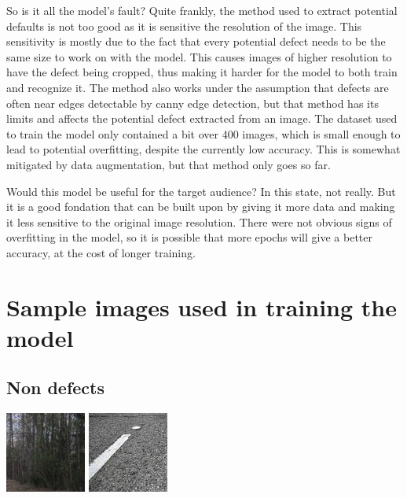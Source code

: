 \documentclass[12pt, letterpaper, twoside]{article}
\begin{document}
So is it all the model's fault? 
Quite frankly, the method used to extract potential defaults is not too good as it is sensitive the resolution of the image.
This sensitivity is mostly due to the fact that every potential defect needs to be the same size to work on with the model.
This causes images of higher resolution to have the defect being cropped, thus making it harder for the model to both train and recognize it.
The method also works under the assumption that defects are often near edges detectable by canny edge detection, 
but that method has its limits and affects the potential defect extracted from an image.
The dataset used to train the model only contained a bit over 400 images, 
which is small enough to lead to potential overfitting, despite the currently low accuracy.
This is somewhat mitigated by data augmentation, but that method only goes so far.

Would this model be useful for the target audience?
In this state, not really.
But it is a good fondation that can be built upon by giving it more data and making it less sensitive to the original image resolution.
There were not obvious signs of overfitting in the model, 
so it is possible that more epochs will give a better accuracy,
at the cost of longer training.

\appendix

\section{Sample images used in training the model}
\label{app:train_data}

\subsection{Non defects}
\includegraphics{rd1_0.jpg}
\includegraphics{rd2_9.jpg}
\end{document}
